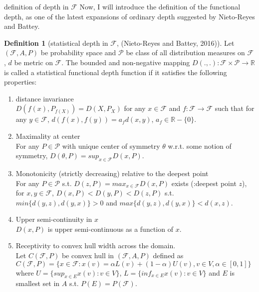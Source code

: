 \documentclass[aspectratio=169,ignorenonframetext,9pt]{beamer}
\theoremstyle{plain}
\theoremstyle{definition}
\newtheorem{defn}{Definition}[section]
\begin{document}
\begin{frame}{definition of depth in $\mathcal{F}$}
Now, I will introduce the definition of the functional depth, as one of the latest expansions of ordinary depth
suggested by Nieto-Reyes and Battey.
\begin{defn}[statistical depth in $\mathcal{F}$, (Nieto-Reyes and Battey, 2016)]
    Let $(\mathcal{F},A,P)$ be probability space and $\mathcal{P}$ be class of all distribution measures on $\mathcal{F}$,
    $d$ be metric on $\mathcal{F}$.
    The bounded and non-negative mapping $D(.,.): \mathcal{F}\times \mathcal{P} \rightarrow \mathbb{R}$ is called
    a statistical functional depth function if it satisfies the following properties:
    \begin{enumerate}
        \item distance invariance \\
            $D(f(x),P_{f(X)})=D(X,P_X)$ for any $x\in\mathcal{F}$ and $f:\mathcal{F}\rightarrow\mathcal{F}$
            such that for any $y\in\mathcal{F}$, $d(f(x),f(y))=a_fd(x,y)$, $a_f\in\mathbb{R}-\{0\}$.
        \item Maximality at center \\
            For any $P\in\mathcal{P}$ with unique center of symmetry 
            $\theta$ w.r.t. some notion of symmetry, 
            $D(\theta,P)=sup_{x\in\mathcal{F}}D(x,P)$.
        \item Monotonicity (strictly decreasing) relative to the deepest point \\
            For any $P \in \mathcal{P}$ s.t. $D(z,P)=max_{x\in\mathcal{F}}D(x,P)$ exists (:deepest point $z$), 
            for $x,y\in\mathcal{F}$, $D(x,P)<D(y,P)<D(z,P)$ s.t. $min\{d(y,z),d(y,x)\}>0$ and $max\{d(y,z), d(y,x)\}<d(x,z)$.
        \item Upper semi-continuity in $x$ \\
            $D(x,P)$ is upper semi-continuous as a function of $x$.
        \item Receptivity to convex hull width across the domain. \\
            Let $C(\mathcal{F},P)$ be convex hull in $(\mathcal{F},A,P)$ defined as
            \(C(\mathcal{F},P)=\{x\in\mathcal{F} : x(v)=\alpha L(v)+ (1-\alpha)U(v), v\in V, \alpha\in[0,1]\}\)
            where $U=\{sup_{x\in E}x(v):v\in V\}$, $L=\{inf_{x\in E}x(v):v\in V\}$
            and $E$ is smallest set in $A$ s.t. $P(E)=P(\mathcal{F})$.


\end{enumerate}
\end{defn}
\end{frame}
\end{document}
